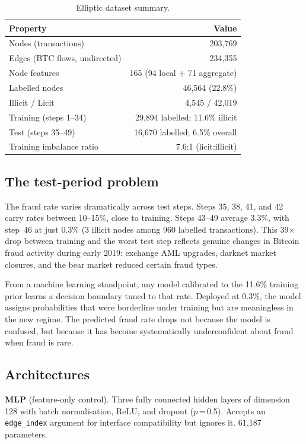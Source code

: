 \documentclass[11pt]{article}
\begin{document}
\begin{table}[t]
\centering
\small
\caption{Elliptic dataset summary.}
\label{tab:dataset}
\begin{tabular}{lr}
\toprule
\textbf{Property} & \textbf{Value} \\
\midrule
Nodes (transactions) & 203,769 \\
Edges (BTC flows, undirected) & 234,355 \\
Node features & 165 (94 local + 71 aggregate) \\
Labelled nodes & 46,564 (22.8\%) \\
\quad Illicit / Licit & 4,545 / 42,019 \\
Training (steps 1--34) & 29,894 labelled; 11.6\% illicit \\
Test (steps 35--49) & 16,670 labelled; 6.5\% overall \\
Training imbalance ratio & 7.6:1 (licit:illicit) \\
\bottomrule
\end{tabular}
\end{table}

\subsection{The test-period problem}

The fraud rate varies dramatically across test steps.  Steps 35, 38,
41, and 42 carry rates between 10--15\%, close to training.  Steps
43--49 average 3.3\%, with step~46 at just 0.3\% (3 illicit nodes
among 960 labelled transactions).  This 39$\times$ drop between
training and the worst test step reflects genuine changes in Bitcoin
fraud activity during early 2019: exchange AML upgrades, darknet
market closures, and the bear market reduced certain fraud types.

From a machine learning standpoint, any model calibrated to the
11.6\% training prior learns a decision boundary tuned to that rate.
Deployed at 0.3\%, the model assigns probabilities that were
borderline under training but are meaningless in the new regime.
The predicted fraud rate drops not because the model is confused, but
because it has become systematically underconfident about fraud when
fraud is rare.

\subsection{Architectures}

\textbf{MLP} (feature-only control).  Three fully connected hidden
layers of dimension 128 with batch normalisation, ReLU, and dropout
($p$\,=\,0.5).  Accepts an \texttt{edge\_index} argument for
interface compatibility but ignores it.  61,187 parameters.
\end{document}
